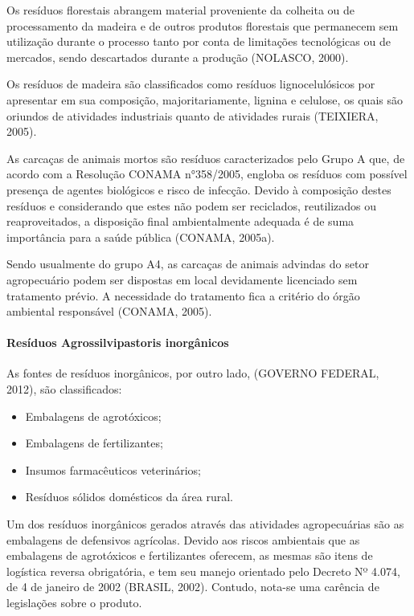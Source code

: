 	Os resíduos florestais abrangem material proveniente da colheita ou de processamento da madeira e de outros produtos florestais que permanecem sem utilização durante o processo tanto por conta de limitações tecnológicas ou de mercados, sendo descartados durante a produção (NOLASCO, 2000). 
	
	Os resíduos de madeira são classificados como resíduos lignocelulósicos por apresentar em sua composição, majoritariamente, lignina e celulose, os quais são oriundos de atividades industriais quanto de atividades rurais (TEIXIERA, 2005).
	
	As carcaças de animais mortos são resíduos caracterizados pelo Grupo A que, de acordo com a Resolução CONAMA n°358/2005, engloba os resíduos com possível presença de agentes biológicos e risco de infecção. Devido à composição destes resíduos e considerando que estes não podem ser reciclados, reutilizados ou reaproveitados, a disposição final ambientalmente adequada é de suma importância para a saúde pública (CONAMA, 2005a).
	
	Sendo usualmente do grupo A4, as carcaças de animais advindas do setor agropecuário podem ser dispostas em local devidamente licenciado sem tratamento prévio. A necessidade do tratamento fica a critério do órgão ambiental responsável (CONAMA, 2005).
	
	\paragraph{Resíduos Agrossilvipastoris inorgânicos}
	
	As fontes de resíduos inorgânicos, por outro lado, (GOVERNO FEDERAL, 2012), são classificados:
	
	\begin{itemize}
		\item 	Embalagens de agrotóxicos;
		\item   Embalagens de fertilizantes;
		\item 	Insumos farmacêuticos veterinários;
		\item   Resíduos sólidos domésticos da área rural.
	\end{itemize}

	Um dos resíduos inorgânicos gerados através das atividades agropecuárias são as embalagens de defensivos agrícolas. Devido aos riscos ambientais que as embalagens de agrotóxicos e fertilizantes oferecem, as mesmas são itens de logística reversa obrigatória, e tem seu manejo orientado pelo Decreto Nº 4.074, de 4 de janeiro de 2002 (BRASIL, 2002). Contudo, nota-se uma carência de legislações sobre o produto.
	
